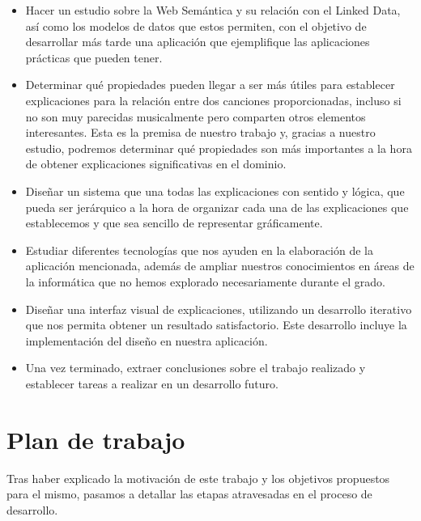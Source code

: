 \begin{itemize}
\item Hacer un estudio sobre la Web Semántica y su relación con el Linked Data, así como los modelos de datos que estos permiten, con el objetivo de desarrollar más tarde una aplicación que ejemplifique las aplicaciones prácticas que pueden tener.\\

\item Determinar qué propiedades pueden llegar a ser más útiles para establecer explicaciones para la relación entre dos canciones proporcionadas, incluso si no son muy parecidas musicalmente pero comparten otros elementos interesantes. Esta es la premisa de nuestro trabajo y, gracias a nuestro estudio, podremos determinar qué propiedades son más importantes a la hora de obtener explicaciones significativas en el dominio.\\

\item Diseñar un sistema que una todas las explicaciones con sentido y lógica, que pueda ser jerárquico a la hora de organizar cada una de las explicaciones que establecemos y que sea sencillo de representar gráficamente.\\

\item Estudiar diferentes tecnologías que nos ayuden en la elaboración de la aplicación mencionada, además de ampliar nuestros conocimientos en áreas de la informática que no hemos explorado necesariamente durante el grado.\\

\item Diseñar una interfaz visual de explicaciones, utilizando un desarrollo iterativo que nos permita obtener un resultado satisfactorio. Este desarrollo incluye la implementación del diseño en nuestra aplicación.\\

\item Una vez terminado, extraer conclusiones sobre el trabajo realizado y establecer tareas a realizar en un desarrollo futuro.\\
\end{itemize}


\section{Plan de trabajo}

Tras haber explicado la motivación de este trabajo y los objetivos propuestos para el mismo, pasamos a detallar las etapas atravesadas en el proceso de desarrollo.\\

